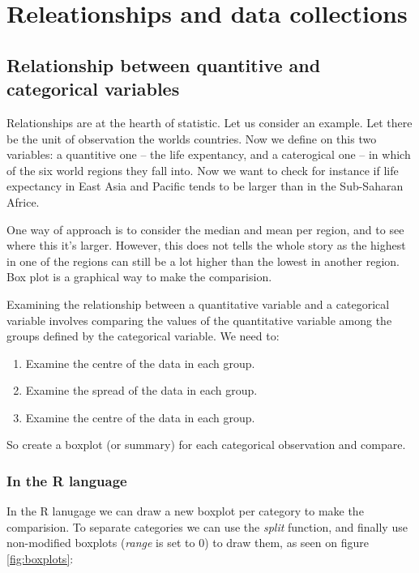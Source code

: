 \chapter*{Releationships and data collections}
\setcounter{section}{0}
\renewcommand*{\theHsection}{ch2.\the\value{section}}

\section{Relationship between quantitive and categorical variables}

Relationships are at the hearth of statistic. Let us consider an example. Let
there be the unit of observation the worlds countries. Now we define on this two
variables: a quantitive one -- the life expentancy, and a caterogical one -- in
which of the six world regions they fall into. Now we want to check for instance
if life expectancy in East Asia and Pacific tends to be larger than in the
Sub-Saharan Africe.

One way of approach is to consider the median and mean per region, and to see
where this it's larger. However, this does not tells the whole story as the
highest in one of the regions can still be a lot higher than the lowest in
another region. Box plot is a graphical way to make the comparision.

Examining the relationship between a quantitative variable and a categorical
variable involves comparing the values of the quantitative variable among the
groups defined by the categorical variable. We need to:

\begin{enumerate}
	\item Examine the centre of the data in each group.
	\item Examine the spread of the data in each group.
	\item Examine the centre of the data in each group.
\end{enumerate}

So create a boxplot (or summary) for each categorical observation and compare.

\subsection{In the R language}

In the R lanugage we can draw a new boxplot per category to make the
comparision. To separate categories we can use the \emph{split} function, and
finally use non-modified boxplots (\emph{range} is set to $0$) to draw them,
as seen on figure \ref{fig:boxplots}:

